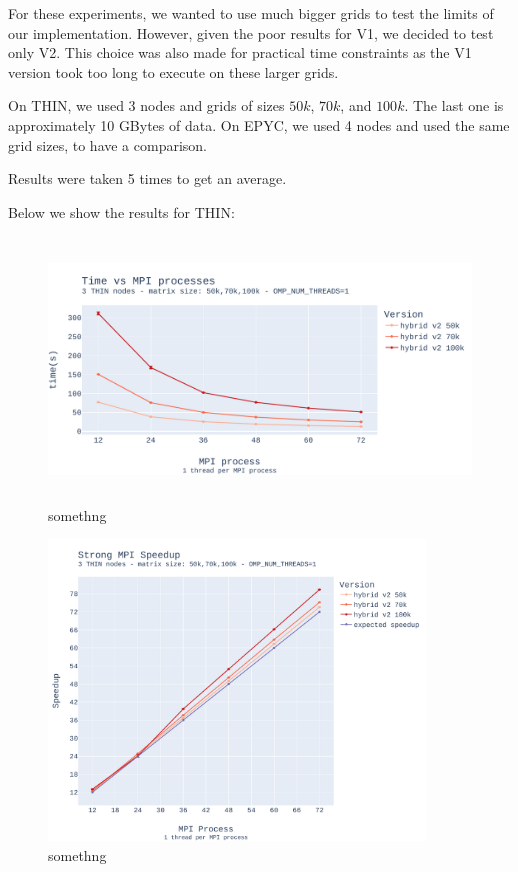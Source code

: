 \documentclass{report}
\begin{document}
For these experiments, we wanted to use much bigger grids to test the limits 
of our implementation. However, given the poor results for V1, we 
decided to test only V2. This choice was also made for practical time 
constraints as the V1 version took too long to execute on these larger grids. 

On THIN, we used 3 nodes and grids of sizes $50k$, $70k$, and $100k$. The last 
one is approximately 10 GBytes of data. On EPYC, we used 4 nodes and used the 
same grid sizes, to have a comparison.

Results were taken 5 times to get an average.

Below we show the results for THIN:

\begin{figure}[H]
\centering
\includegraphics[width=14cm, height=7cm]{./images/strong_MPI_thin_hybrid.pdf}
\caption{\label{fig:strongmpithinhybrid} somethng}
\end{figure}

\begin{figure}[H]
\centering
\includegraphics[width=10cm, height=8cm]{./images/strong_MPI_thin_hybrid_speedup.pdf}
\caption{\label{fig:strongmpithinhybridspeedup} somethng}
\end{figure}
\end{document}
